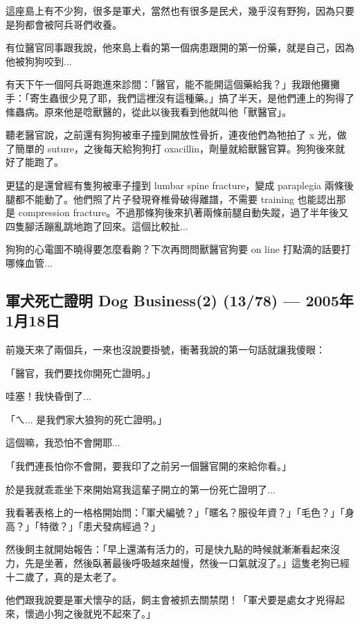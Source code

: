 \documentclass[12pt,a4paper]{article}
\newenvironment{myquote}{%
    \begin{tcolorbox}[
        colback=quote_bg,
        colframe=emergency_gray,
        boxrule=0pt,
        leftrule=3pt,
        arc=0pt,
        left=10pt,
        right=10pt,
        top=8pt,
        bottom=8pt
    ]
    \itshape
}{%
    \end{tcolorbox}
}
\begin{document}
這座島上有不少狗，很多是軍犬，當然也有很多是民犬，幾乎沒有野狗，因為只要是狗都會被阿兵哥們收養。

有位醫官同事跟我說，他來島上看的第一個病患跟開的第一份藥，就是自己，因為他被狗狗咬到...

有天下午一個阿兵哥跑進來診間：「醫官，能不能開這個藥給我？」我跟他攤攤手：「寄生蟲很少見了耶，我們這裡沒有這種藥。」搞了半天，是他們連上的狗得了絛蟲病。原來他是唸獸醫的，從此以後我看到他就叫他「獸醫官」。

聽老醫官說，之前還有狗狗被車子撞到開放性骨折，連夜他們為牠拍了 x 光，做了簡單的 suture，之後每天給狗狗打 oxacillin，劑量就給獸醫官算。狗狗後來就好了能跑了。

更猛的是還曾經有隻狗被車子撞到 lumbar spine fracture，變成 paraplegia 兩條後腿都不能動了。他們照了片子發現脊椎骨破得離譜，不需要 training 也能認出那是 compression fracture。不過那條狗後來扒著兩條前腿自動失蹤，過了半年後又四隻腳活蹦亂跳地跑了回來。這個比較扯...

\begin{myquote}
狗狗的心電圖不曉得要怎麼看齁？下次再問問獸醫官狗要 on line 打點滴的話要打哪條血管...
\end{myquote}

\subsection{軍犬死亡證明 Dog Business(2) (13/78) — 2005年1月18日}

前幾天來了兩個兵，一來也沒說要掛號，衝著我說的第一句話就讓我傻眼：

「醫官，我們要找你開死亡證明。」

哇塞！我快昏倒了...

「ㄟ... 是我們家大狼狗的死亡證明。」

這個嘛，我恐怕不會開耶...

「我們連長怕你不會開，要我印了之前另一個醫官開的來給你看。」

於是我就乖乖坐下來開始寫我這輩子開立的第一份死亡證明了...

我看著表格上的一格格開始問：「軍犬編號？」「暱名？服役年資？」「毛色？」「身高？」「特徵？」「患犬發病經過？」

然後飼主就開始報告：「早上還滿有活力的，可是快九點的時候就漸漸看起來沒力，先是坐著，然後臥著最後呼吸越來越慢，然後一口氣就沒了。」這隻老狗已經十二歲了，真的是太老了。

他們跟我說要是軍犬懷孕的話，飼主會被抓去關禁閉！「軍犬要是處女才兇得起來，懷過小狗之後就兇不起來了。」
\end{document}
